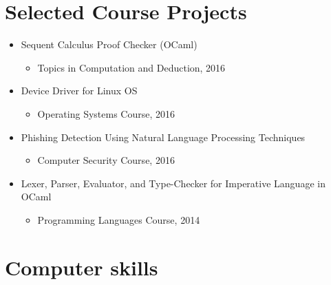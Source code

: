 \documentclass[11pt,a4paper,sans]{moderncv}        %
\begin{document}

\section{Selected Course Projects}
\begin{itemize}
\item Sequent Calculus Proof Checker (OCaml)
    \begin{itemize}
    \item Topics in Computation and Deduction, 2016
    \end{itemize}

\item Device Driver for Linux OS
    \begin{itemize}
    \item Operating Systems Course, 2016
    \end{itemize}

\item Phishing Detection Using Natural Language Processing Techniques
    \begin{itemize}
    \item Computer Security Course, 2016
    \end{itemize}
    
\item Lexer, Parser, Evaluator, and Type-Checker for Imperative Language in OCaml
    \begin{itemize}
    \item Programming Languages Course, 2014
    \end{itemize}



\end{itemize}

\section{Computer skills}

%
\end{document}
